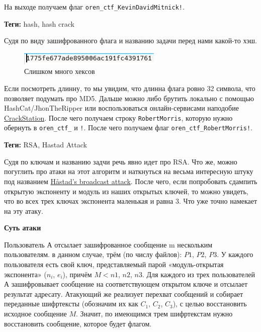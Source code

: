 \documentclass[idxtotoc,hyperref,openany,oneside]{files/crypto} %
\begin{document}
На выходе получаем флаг \verb|oren_ctf_KevinDavidMitnick!|.



\textbf{Теги:} hash, hash crack\vspace{\baselineskip}

Судя по виду зашифрованного флага и названию задачи перед нами какой-то хэш.
\begin{figure}[H]
\begin{center}
\includegraphics[width=1.0\linewidth]{files/md5flag}
\end{center}
\caption{Слишком много хексов}
\label{fig:chinese}
\end{figure}
Если посмотреть длинну, то мы увидим, что длинна флага ровно 32 символа, что позволяет подумать про MD5. Дальше можно либо брутить локально с помощью HashCat/JhonTheRipper или воспользоваться онлайн-сервисами наподобие \href{https://crackstation.net/}{CrackStation}. После чего получаем строку \verb|RobertMorris|, которую нужно обернуть в \verb|oren_ctf_| и \verb|!|. После чего получаем флаг \verb|oren_ctf_RobertMorris!|.




\textbf{Теги:} RSA, Hastad Attack\vspace{\baselineskip}

Судя по ключам и названию задчи речь явно идет про RSA. Что же, можно погуглить про атаки на этот алгоритм и наткнуться на весьма интересную штуку под названием \href{https://en.wikipedia.org/wiki/Coppersmith\%27s_attack#H\%C3\%A5stad's_broadcast_attack}{Håstad's broadcast attack}. После чего, если попробовать сдампить открытую экспоненту и модуль из наших открытых ключей, то можно увидеть, что во всех трех ключах экспонента маленькая и равна 3. Что уже точно намекает на эту атаку. 

\textbf{Суть атаки}

Пользователь $А$ отсылает зашифрованное сообщение m нескольким пользователям. в данном случае, трём (по числу файлов): $P1$, $P2$, $P3$. У каждого пользователя есть свой ключ, представляемый парой «модуль-открытая экспонента» ($n_i$, $e_i$), причём $M < n1$, $n2$, $n3$. Для каждого из трех пользователей $А$ зашифровывает сообщение на соответствующем открытом ключе и отсылает результат адресату.
Атакующий же реализует перехват сообщений и собирает переданные шифртексты (обозначим их как $C_1$, $C_2$, $C_3$), с целью восстановить исходное сообщение $M$. Значит, по имеющимся трем шифртекстам нужно восстановить сообщение, которое будет флагом.
\end{document}
